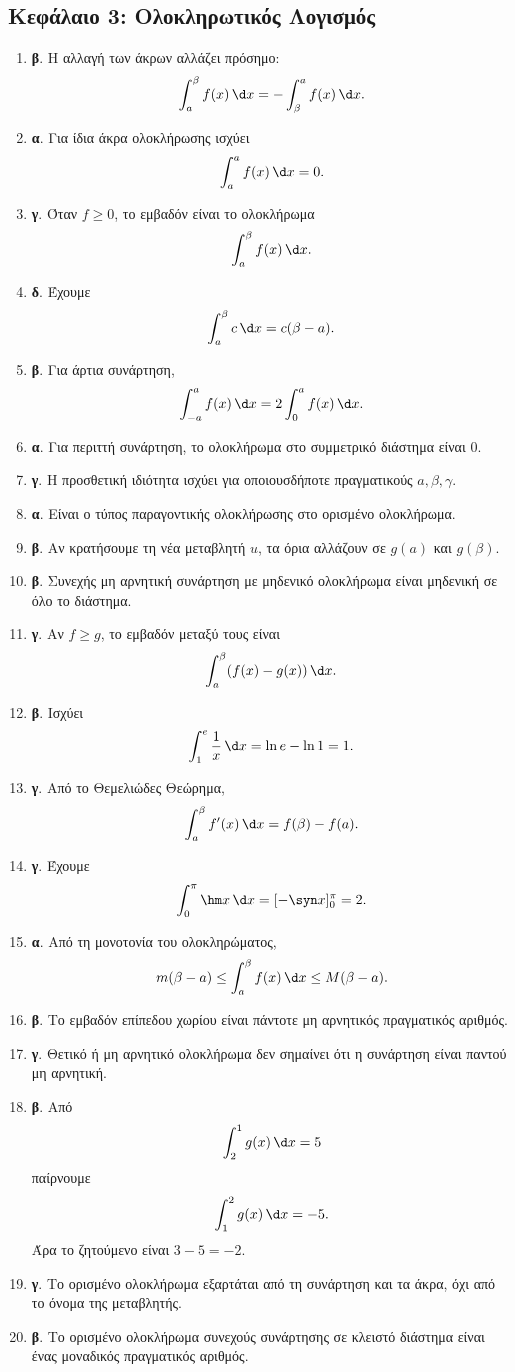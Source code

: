 \subsection*{Κεφάλαιο 3: Ολοκληρωτικός Λογισμός}
\begin{enumerate}[label=\textbf{3.\arabic*.}]
\item \textbf{β}. Η αλλαγή των άκρων αλλάζει πρόσημο:
\[
\dint_a^\beta f(x)\,\d x=-\dint_\beta^a f(x)\,\d x.
\]
\item \textbf{α}. Για ίδια άκρα ολοκλήρωσης ισχύει
\[
\dint_a^a f(x)\,\d x=0.
\]
\item \textbf{γ}. Όταν $f\geq0$, το εμβαδόν είναι το ολοκλήρωμα
\[
\dint_a^\beta f(x)\,\d x.
\]
\item \textbf{δ}. Έχουμε
\[
\dint_a^\beta c\,\d x=c(\beta-a).
\]
\item \textbf{β}. Για άρτια συνάρτηση,
\[
\dint_{-a}^a f(x)\,\d x=2\dint_0^a f(x)\,\d x.
\]
\item \textbf{α}. Για περιττή συνάρτηση, το ολοκλήρωμα στο συμμετρικό διάστημα είναι $0$.
\item \textbf{γ}. Η προσθετική ιδιότητα ισχύει για οποιουσδήποτε πραγματικούς $a,\beta,\gamma$.
\item \textbf{α}. Είναι ο τύπος παραγοντικής ολοκλήρωσης στο ορισμένο ολοκλήρωμα.
\item \textbf{β}. Αν κρατήσουμε τη νέα μεταβλητή $u$, τα όρια αλλάζουν σε $g(a)$ και $g(\beta)$.
\item \textbf{β}. Συνεχής μη αρνητική συνάρτηση με μηδενικό ολοκλήρωμα είναι μηδενική σε όλο το διάστημα.
\item \textbf{γ}. Αν $f\geq g$, το εμβαδόν μεταξύ τους είναι
\[
\dint_a^\beta (f(x)-g(x))\,\d x.
\]
\item \textbf{β}. Ισχύει
\[
\dint_1^e \frac1x\,\d x=\ln e-\ln1=1.
\]
\item \textbf{γ}. Από το Θεμελιώδες Θεώρημα,
\[
\dint_a^\beta f'(x)\,\d x=f(\beta)-f(a).
\]
\item \textbf{γ}. Έχουμε
\[
\dint_0^\pi \hm x\,\d x=[-\syn x]_0^\pi=2.
\]
\item \textbf{α}. Από τη μονοτονία του ολοκληρώματος,
\[
m(\beta-a)\leq \dint_a^\beta f(x)\,\d x\leq M(\beta-a).
\]
\item \textbf{β}. Το εμβαδόν επίπεδου χωρίου είναι πάντοτε μη αρνητικός πραγματικός αριθμός.
\item \textbf{γ}. Θετικό ή μη αρνητικό ολοκλήρωμα δεν σημαίνει ότι η συνάρτηση είναι παντού μη αρνητική.
\item \textbf{β}. Από
\[
\dint_2^1 g(x)\,\d x=5
\]
παίρνουμε
\[
\dint_1^2 g(x)\,\d x=-5.
\]
Άρα το ζητούμενο είναι $3-5=-2$.
\item \textbf{γ}. Το ορισμένο ολοκλήρωμα εξαρτάται από τη συνάρτηση και τα άκρα, όχι από το όνομα της μεταβλητής.
\item \textbf{β}. Το ορισμένο ολοκλήρωμα συνεχούς συνάρτησης σε κλειστό διάστημα είναι ένας μοναδικός πραγματικός αριθμός.
\end{enumerate}

